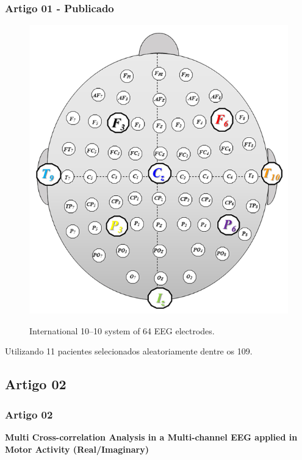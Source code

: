 \documentclass[11pt, aspectratio=169]{beamer}
\begin{document}
\begin{frame}
  \frametitle{Artigo 01 - Publicado}
  \begin{figure}[!htb]
    \centering
    \caption{International 10–10 system of 64 EEG electrodes.}
    \includegraphics[height=.6\paperheight]{../Figures/artigo_anexo/canais_cabeca.png}
    \label{fig:ar_canais_cabeça}
  \end{figure}
  Utilizando 11 pacientes selecionados aleatoriamente dentre os 109.
\end{frame}



\subsection{Artigo 02}

\begin{frame}
  \frametitle{Artigo 02}

  \textbf{\Large{Multi Cross-correlation Analysis in a Multi-channel EEG applied in Motor Activity (Real/Imaginary)}}
  \medskip

\end{frame}
\end{document}
